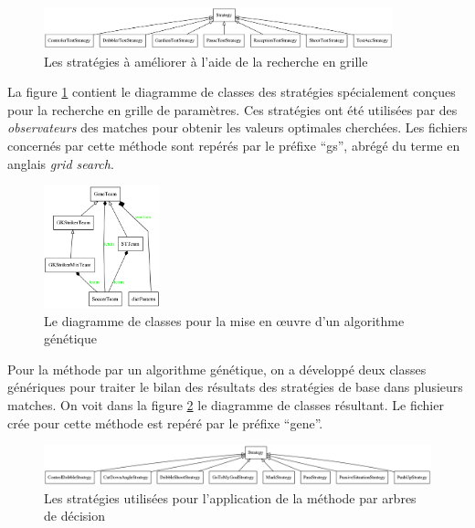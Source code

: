 \documentclass[12pt,a4paper]{article}
\begin{document}
\begin{figure}[!h]
  \centering
  \captionsetup{justification=centering}
  \includegraphics[width=0.9\textwidth]{gridSearch}
  \caption[Les strat\'egies pour la recherche en grille]{Les strat\'egies \`a 
am\'eliorer \`a l'aide de la recherche en grille}
  \label{fig:gs}
\end{figure}

La figure \ref{fig:gs} contient le diagramme de classes des strat\'egies 
sp\'ecialement con\c{c}ues pour la recherche en grille de param\`etres. Ces 
strat\'egies ont \'et\'e utilis\'ees par des {\itshape observateurs} des 
matches pour obtenir les valeurs optimales cherch\'ees. Les fichiers 
concern\'es par cette m\'ethode sont rep\'er\'es par le pr\'efixe 
\enquote{gs}, abr\'eg\'e du terme en anglais {\itshape grid search}.

\begin{figure}[!h]
  \centering
  \captionsetup{justification=centering}
  \includegraphics[width=0.3\textwidth]{genetic_mod}
  \caption[Les classes pour l'algorithme g\'en\'etique]{Le diagramme de 
	classes pour la mise en \oe uvre d'un algorithme g\'en\'etique}
  \label{fig:gene}
\end{figure}

Pour la m\'ethode par un algorithme g\'en\'etique, on a d\'evelopp\'e deux 
classes g\'en\'eriques pour traiter le bilan des r\'esultats des strat\'egies 
de base dans plusieurs matches. On voit dans la figure \ref{fig:gene} le 
diagramme de classes r\'esultant. Le fichier cr\'ee pour cette m\'ethode 
est rep\'er\'e par le pr\'efixe \enquote{gene}.

\begin{figure}[!h]
  \centering
  \captionsetup{justification=centering}
  \includegraphics[width=1.\textwidth]{decisionTree}
  \caption[Les strat\'egies pour l'arbre de d\'ecision]{Les strat\'egies 
utilis\'ees pour l'application de la m\'ethode par arbres de d\'ecision}
  \label{fig:dt}
\end{figure}
\end{document}
